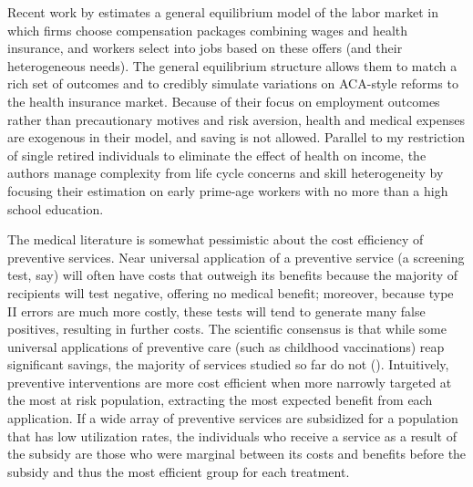 \documentclass[12pt,pdftex,letterpaper]{article}
\begin{document}
Recent work by \cite{aizawa15} estimates a general equilibrium model of the labor market in which firms choose compensation packages combining wages and health insurance, and workers select into jobs based on these offers (and their heterogeneous needs).  The general equilibrium structure allows them to match a rich set of outcomes and to credibly simulate variations on ACA-style reforms to the health insurance market.  Because of their focus on employment outcomes rather than precautionary motives and risk aversion, health and medical expenses are exogenous in their model, and saving is not allowed.  Parallel to my restriction of single retired individuals to eliminate the effect of health on income, the authors manage complexity from life cycle concerns and skill heterogeneity by focusing their estimation on early prime-age workers with no more than a high school education.

The medical literature is somewhat pessimistic about the cost efficiency of preventive services.  Near universal application of a preventive service (a screening test, say) will often have costs that outweigh its benefits because the majority of recipients will test negative, offering no medical benefit; moreover, because type II errors are much more costly, these tests will tend to generate many false positives, resulting in further costs. The scientific consensus is that while some universal applications of preventive care (such as childhood vaccinations) reap significant savings, the majority of services studied so far do not (\cite{russell93,russell07,russell09}).  Intuitively, preventive interventions are more cost efficient when more narrowly targeted at the most at risk population, extracting the most expected benefit from each application.  If a wide array of preventive services are subsidized for a population that has low utilization rates, the individuals who receive a service as a result of the subsidy are those who were marginal between its costs and benefits before the subsidy and thus the most efficient group for each treatment.
\end{document}
